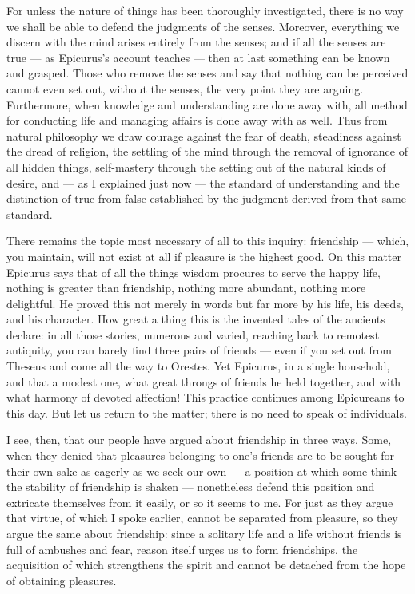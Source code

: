 For unless the nature of things has been thoroughly investigated, there is no way we shall be able to defend the judgments of the senses. Moreover, everything we discern with the mind arises entirely from the senses; and if all the senses are true — as Epicurus's account teaches — then at last something can be known and grasped. Those who remove the senses and say that nothing can be perceived cannot even set out, without the senses, the very point they are arguing. Furthermore, when knowledge and understanding are done away with, all method for conducting life and managing affairs is done away with as well. Thus from natural philosophy we draw courage against the fear of death, steadiness against the dread of religion, the settling of the mind through the removal of ignorance of all hidden things, self-mastery through the setting out of the natural kinds of desire, and — as I explained just now — the standard of understanding and the distinction of true from false established by the judgment derived from that same standard.

 There remains the topic most necessary of all to this inquiry: friendship — which, you maintain, will not exist at all if pleasure is the highest good. On this matter Epicurus says that of all the things wisdom procures to serve the happy life, nothing is greater than friendship, nothing more abundant, nothing more delightful. He proved this not merely in words but far more by his life, his deeds, and his character. How great a thing this is the invented tales of the ancients declare: in all those stories, numerous and varied, reaching back to remotest antiquity, you can barely find three pairs of friends — even if you set out from Theseus and come all the way to Orestes. Yet Epicurus, in a single household, and that a modest one, what great throngs of friends he held together, and with what harmony of devoted affection! This practice continues among Epicureans to this day. But let us return to the matter; there is no need to speak of individuals.

 I see, then, that our people have argued about friendship in three ways. Some, when they denied that pleasures belonging to one's friends are to be sought for their own sake as eagerly as we seek our own — a position at which some think the stability of friendship is shaken — nonetheless defend this position and extricate themselves from it easily, or so it seems to me. For just as they argue that virtue, of which I spoke earlier, cannot be separated from pleasure, so they argue the same about friendship: since a solitary life and a life without friends is full of ambushes and fear, reason itself urges us to form friendships, the acquisition of which strengthens the spirit and cannot be detached from the hope of obtaining pleasures.

